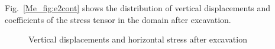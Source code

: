Fig.~\ref{Me_fig:e2cont} shows the distribution of vertical displacements and coefficients of the stress tensor in the domain after excavation.
\begin{figure}[!htb]
  \centering
  \caption{Vertical displacements and horizontal stress after excavation}
  \label{Me_fig_modelhm}
\end{figure}
%
